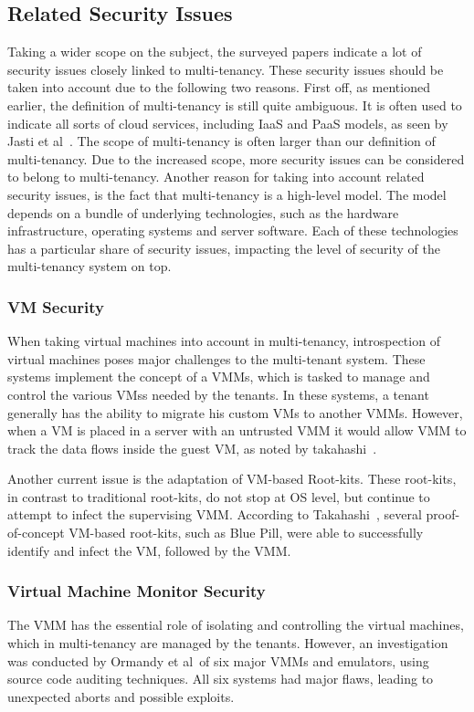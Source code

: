 \subsection{Related Security Issues}
Taking a wider scope on the subject, the surveyed papers indicate a lot of security issues closely linked to multi-tenancy. 
These security issues should be taken into account due to the following two reasons.
First off, as mentioned earlier, the definition of multi-tenancy is still quite ambiguous. 
It is often used to indicate all sorts of cloud services, including IaaS and PaaS models, as seen by Jasti et al~\cite{Jasti2010Security}. 
The scope of multi-tenancy is often larger than our definition of multi-tenancy. Due to the increased scope, more security issues can be considered to belong to multi-tenancy.
Another reason for taking into account related security issues, is the fact that multi-tenancy is a high-level model. 
The model depends on a bundle of underlying technologies, such as the hardware infrastructure, operating systems and server software. 
Each of these technologies has a particular share of security issues, impacting the level of security of the multi-tenancy system on top. \\


\subsubsection{\acf{VM} Security}
When taking virtual machines into account in multi-tenancy, introspection of virtual machines poses major challenges to the multi-tenant system. 
These systems implement the concept of a \acp{VMM}, which is tasked to manage and control the various \acp{VM}s needed by the tenants.
In these systems, a tenant generally has the ability to migrate his custom \acp{VM} to another \acp{VMM}. 
However, when a \ac{VM} is placed in a server with an untrusted \ac{VMM} it would allow \ac{VMM} to track the data flows inside the guest VM, as noted by takahashi~\cite{Takahashi2012Security}.

Another current issue is the adaptation of VM-based Root-kits. 
These root-kits, in contrast to traditional root-kits, do not stop at OS level, but continue to attempt to infect the supervising \ac{VMM}. 
According to Takahashi~\cite{Takahashi2012Security}, several proof-of-concept VM-based root-kits, such as Blue Pill, were able to successfully identify and infect the VM, followed by the \ac{VMM}.

\subsubsection{Virtual Machine Monitor Security}
The \acl{VMM} has the essential role of isolating and controlling the virtual machines, which in multi-tenancy are managed by the tenants.
However, an investigation was conducted by Ormandy et al~\cite{Ormandy2007Security}of six major \acp{VMM} and emulators, using source code auditing techniques. All six systems had major flaws, leading to unexpected aborts and possible exploits.

